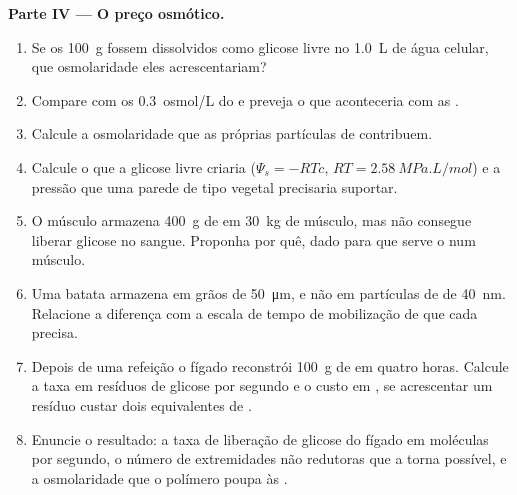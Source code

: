 \begin{problem}
\medskip
\noindent\textbf{Parte IV --- O preço osmótico.}
\begin{enumerate}[resume]
  \item Se os \qty{100}{g} fossem dissolvidos como glicose livre no
        \qty{1.0}{L} de água celular, que osmolaridade eles
        acrescentariam?
  \item Compare com os \qty{0.3}{osmol/L} do  e preveja o que
        aconteceria com as .
  \item Calcule a osmolaridade que as próprias partículas de 
        contribuem.
  \item Calcule o  que a glicose livre criaria
        ($\Psi_s = -RTc$, $RT = \qty{2.58}{MPa.L/mol}$) e a pressão que
        uma parede de tipo vegetal precisaria suportar.
  \item O músculo armazena \qty{400}{g} de  em \qty{30}{kg} de
        músculo, mas não consegue liberar glicose no sangue. Proponha
        por quê, dado para que serve o  num músculo.
  \item Uma batata armazena  em grãos de \qty{50}{\micro m}, e não
        em partículas de  de \qty{40}{nm}. Relacione a
        diferença com a escala de tempo de mobilização de que cada
         precisa.
  \item Depois de uma refeição o fígado reconstrói \qty{100}{g} de
         em quatro horas. Calcule a taxa em resíduos de
        glicose por segundo e o custo em , se acrescentar um resíduo
        custar dois equivalentes de .
  \item Enuncie o resultado: a taxa de liberação de glicose do fígado em
        moléculas por segundo, o número de extremidades não redutoras
        que a torna possível, e a osmolaridade que o polímero poupa às
        .
\end{enumerate}
\end{problem}
